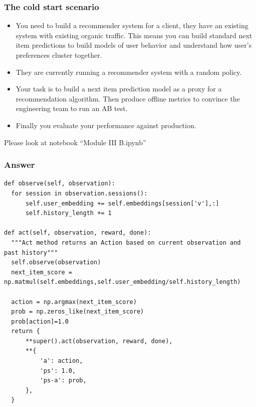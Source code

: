\begin{frame}
  \frametitle{The cold start scenario}

    \begin{itemize}
      \item You need to build a recommender system for a client, they have an existing system with existing organic traffic.  \pause This means you can build standard next item predictions to build models of user behavior and understand how user's preferences cluster together. \pause
      \item They are currently running a recommender system with a random policy. \pause
      \item Your task is to build a next item prediction model as a proxy for a recommendation algorithm.  Then produce offline metrics to convince the engineering team to run an AB test.\pause
      \item Finally you evaluate your performance against production.
    \end{itemize}

    \pause
    Please look at notebook ``Module III B.ipynb''

\end{frame}



\begin{frame}[fragile]
  \frametitle{Answer}
\begin{tiny}  
\begin{verbatim}
def observe(self, observation):
  for session in observation.sessions():
      self.user_embedding += self.embeddings[session['v'],:]
      self.history_length += 1

def act(self, observation, reward, done):
  """Act method returns an Action based on current observation and past history"""
  self.observe(observation)
  next_item_score = np.matmul(self.embeddings,self.user_embedding/self.history_length)

  action = np.argmax(next_item_score)        
  prob = np.zeros_like(next_item_score)
  prob[action]=1.0
  return {
      **super().act(observation, reward, done),
      **{
          'a': action,
          'ps': 1.0,
          'ps-a': prob,
      },
  }
\end{verbatim}
\end{tiny}
\end{frame}




